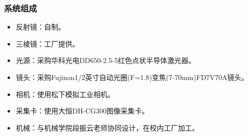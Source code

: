 \documentclass{beamer}
\begin{document}
\begin{frame}[label=systemconstitute]
  \frametitle{系统组成}
  \begin{itemize}
  \item
  反射镜：自制。
  \item
  三棱镜：工厂提供。
  \item
  光源：采购华科光电DD650-2.5-5红色点状半导体激光器。
  \item
  镜头：采购Fujinon1/2英寸自动光圈(F=1.8)变焦(7-70mm)FD7V70A镜头。
  \item
  相机：使用松下模拟工业相机。
  \item
  采集卡：使用大恒DH-CG300图像采集卡。
  \item
  机械：与机械学院段振云老师协同设计，在校内工厂加工。
  \end{itemize}

  \hyperlink{machinery<1>}{}
\end{frame}
\end{document}
